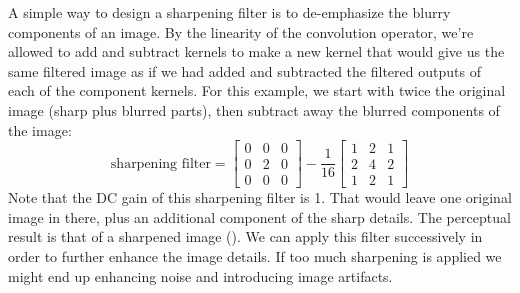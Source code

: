 

A simple way to design a sharpening filter is
to de-emphasize the blurry components of an image.  By the linearity
of the convolution operator, we're allowed to add and
subtract kernels to make a new kernel that would give us the same
filtered image as if we had added and subtracted the filtered outputs
of each of the component kernels.  For this example, we start with
twice the original image (sharp plus blurred parts), then subtract
away  the blurred components of the image:
\begin{equation}
	\text{sharpening filter} =
	\begin{bmatrix}
		0 & 0 & 0 \\
		0 & 2 & 0 \\
		0 & 0 & 0
	\end{bmatrix}
	-
	\frac{1}{16}
	\begin{bmatrix}
		1 & 2 & 1 \\
		2 & 4 & 2 \\
		1 & 2 & 1
	\end{bmatrix}
	\label{eq:sharpening}
\end{equation}
Note that the DC gain of this sharpening filter is 1. That would leave
one original image in there, plus an additional component of the sharp
details.  The perceptual result is that of a sharpened image (\fig{\ref{fig:convExamps3}}). We can apply this filter successively in order to further enhance the image details. If too much sharpening is applied we might end up enhancing noise and introducing image artifacts.


